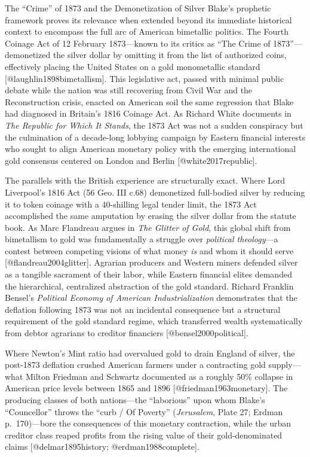 \documentclass[
  ignorenonframetext,
]{beamer}
\begin{document}
\begin{frame}{The ``Crime'' of 1873 and the Demonetization of Silver}
\protect{}\label{the-crime-of-1873-and-the-demonetization-of-silver}
Blake's prophetic framework proves its relevance when extended beyond
its immediate historical context to encompass the full arc of American
bimetallic politics. The Fourth Coinage Act of 12 February 1873---known
to its critics as ``The Crime of 1873''---demonetized the silver dollar
by omitting it from the list of authorized coins, effectively placing
the United States on a gold monometallic standard
{[}@laughlin1898bimetallism{]}. This legislative act, passed with
minimal public debate while the nation was still recovering from Civil
War and the Reconstruction crisis, enacted on American soil the same
regression that Blake had diagnosed in Britain's 1816 Coinage Act. As
Richard White documents in \emph{The Republic for Which It Stands}, the
1873 Act was not a sudden conspiracy but the culmination of a
decade-long lobbying campaign by Eastern financial interests who sought
to align American monetary policy with the emerging international gold
consensus centered on London and Berlin {[}@white2017republic{]}.

The parallels with the British experience are structurally exact. Where
Lord Liverpool's 1816 Act (56 Geo. III c.68) demonetized full-bodied
silver by reducing it to token coinage with a 40-shilling legal tender
limit, the 1873 Act accomplished the same amputation by erasing the
silver dollar from the statute book. As Marc Flandreau argues in
\emph{The Glitter of Gold}, this global shift from bimetallism to gold
was fundamentally a struggle over \emph{political theology}---a contest
between competing visions of what money \emph{is} and whom it should
serve {[}@flandreau2004glitter{]}. Agrarian producers and Western miners
defended silver as a tangible sacrament of their labor, while Eastern
financial elites demanded the hierarchical, centralized abstraction of
the gold standard. Richard Franklin Bensel's \emph{Political Economy of
American Industrialization} demonstrates that the deflation following
1873 was not an incidental consequence but a structural requirement of
the gold standard regime, which transferred wealth systematically from
debtor agrarians to creditor financiers {[}@bensel2000political{]}.

Where Newton's Mint ratio had overvalued gold to drain England of
silver, the post-1873 deflation crushed American farmers under a
contracting gold supply---what Milton Friedman and Schwartz documented
as a roughly 50\% collapse in American price levels between 1865 and
1896 {[}@friedman1963monetary{]}. The producing classes of both
nations---the ``laborious'' upon whom Blake's ``Councellor'' throws the
``curb / Of Poverty'' (\emph{Jerusalem}, Plate 27; Erdman p.~170)---bore
the consequences of this monetary contraction, while the urban creditor
class reaped profits from the rising value of their gold-denominated
claims {[}@delmar1895history; @erdman1988complete{]}.
\end{frame}
\end{document}
